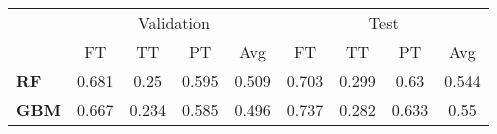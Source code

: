 \begin{tabular}{lcccccccc}
\toprule
{} & \multicolumn{4}{c}{Validation} & \multicolumn{4}{c}{Test} \\
{} &         FT &     TT &     PT &    Avg &     FT &     TT &     PT &    Avg \\
\midrule
\textbf{RF } &      0.681 &   0.25 &  0.595 &  0.509 &  0.703 &  0.299 &   0.63 &  0.544 \\
\textbf{GBM} &      0.667 &  0.234 &  0.585 &  0.496 &  0.737 &  0.282 &  0.633 &   0.55 \\
\bottomrule
\end{tabular}
